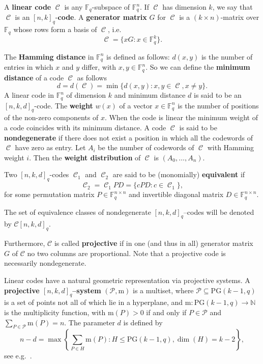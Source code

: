 \documentclass[11pt]{amsart}
\DeclareMathOperator{\C}{\mathcal{C}}
\newcommand{\F}{{\mathbb F}}
\newcommand{\fq}{{\mathbb F}_{q}}
\newcommand{\PG}{\mathrm{PG}}
\newcommand{\classcode}{\mathcal{C}[n,k,d]_q}
\begin{document}
A \textbf{linear code} $\C$ is any $\F_q$-subspace of $\F_{q}^n$.
If $\C$ has dimension $k$, we say that $\C$ is an $[n, k]_q$-\textbf{code}.
A \textbf{generator matrix} $G$ for $\C$ is a $(k \times n)$-matrix over $\F_q$ whose rows form a basis of $\C$, i.e.
\[ \C=\{xG \colon x\in \F_q^k\}. \]

The \textbf{Hamming distance} in $\F_q^n$ is defined as follows: $d(x,y)$ is the number of entries in which $x$ and $y$ differ, with $x,y \in \F_q^n$.
So we can define the \textbf{minimum distance} of a code $\C$ as follows 
\[d=d(\C)=\min\{d(x,y) \colon x,y \in \C, x \ne y\}.\]
A linear code in $\fq^n$ of dimension $k$ and minimum distance $d$ is said to be an $[n, k, d]_q$-code.
The \textbf{weight} $w(x)$ of a vector $x \in \fq^n$ is the number of positions of the non-zero components of $x$. 
When the code is linear the minimum weight of a code coincides with its minimum distance. 
A code $\C$ is said to be \textbf{nondegenerate} if there does not exist a position in which all the codewords of $\C$ have zero as entry.
Let $A_i$ be the number of codewords of $\C$ with Hamming weight $i$. 
Then the \textbf{weight distribution} of $\C$ is $(A_0,\ldots,A_n)$.

Two $[n,k,d]_q$-codes $\C_1$ and $\C_2$ are said to be (monomially) \textbf{equivalent} if 
\[\C_2=\C_1 PD=\{cPD \colon c\in \C_1\},\] 
for some permutation matrix $P \in \F_q^{n \times n}$ and invertible diagonal matrix $D \in \F_q^{n\times n}$. 

The set of equivalence classes of nondegenerate $[n,k,d]_q$--codes will be denoted by $\classcode$.

Furthermore, $ \mathcal C$ is called \textbf{projective} if in one (and thus in all) generator matrix $G$ of $\mathcal C$ no two columns are proportional. Note that a projective code is necessarily nondegenerate.

Linear codes have a natural geometric representation via projective systems. A \textbf{projective $[n, k, d]_q$--system} $(\mathcal{P},\mathrm{m})$ is a multiset, where $\mathcal{P} \subseteq \mathrm{PG}(k - 1, q)$ is a set of points  not
all of which lie in a hyperplane, and $\mathrm{m}: \PG(k-1,q) \rightarrow \mathbb{N}$ is the multiplicity function, with $\mathrm{m}(P)>0$ if and only if $P \in \mathcal{P}$ and $\sum_{P \in \mathcal{P}}\mathrm{m}(P)=n$. The parameter $d$ is defined by
\[n - d = \max\left\{\sum_{P \in H} \mathrm{m}(P): H \leq \PG(k-1,q), \dim(H)=k-2\right\},\]
see  e.g.\ \cite{vladut2007algebraic}.
\end{document}
